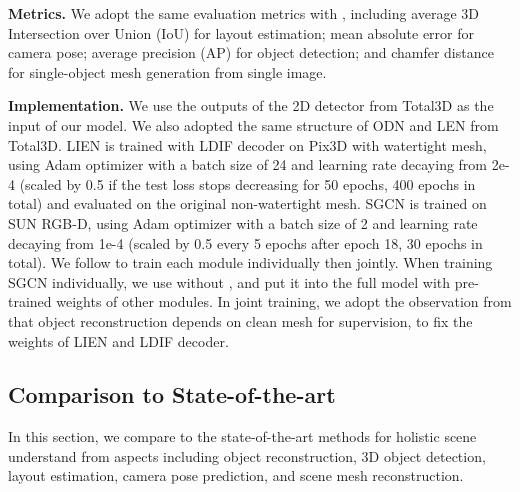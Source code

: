 \documentclass[final]{cvpr}
\begin{document}
\noindent \textbf{Metrics.} 
We adopt the same evaluation metrics with \cite{huang2018cooperative,nie2020total3dunderstanding}, including average 3D Intersection over Union (IoU) for layout estimation; mean absolute error for camera pose; average precision (AP) for object detection; and chamfer distance for single-object mesh generation from single image. 

\noindent \textbf{Implementation.} 
We use the outputs of the 2D detector from Total3D as the input of our model. 
We also adopted the same structure of ODN and LEN from Total3D. 
LIEN is trained with LDIF decoder on Pix3D with watertight mesh, using Adam optimizer with a batch size of 24 and learning rate decaying from 2e-4 (scaled by 0.5 if the test loss stops decreasing for 50 epochs, 400 epochs in total) and evaluated on the original non-watertight mesh. 
SGCN is trained on SUN RGB-D, using Adam optimizer with a batch size of 2 and learning rate decaying from 1e-4 (scaled by 0.5 every 5 epochs after epoch 18, 30 epochs in total). 
We follow \cite{nie2020total3dunderstanding} to train each module individually then jointly.
When training SGCN individually, we use  without , and put it into the full model with pre-trained weights of other modules.
In joint training, we adopt the observation from \cite{nie2020total3dunderstanding} that object reconstruction depends on clean mesh for supervision, to fix the weights of LIEN and LDIF decoder.




\subsection{Comparison to State-of-the-art}
\label{sec:comp}
In this section, we compare to the state-of-the-art methods for holistic scene understand from aspects including object reconstruction, 3D object detection, layout estimation, camera pose prediction, and scene mesh reconstruction.
\end{document}
